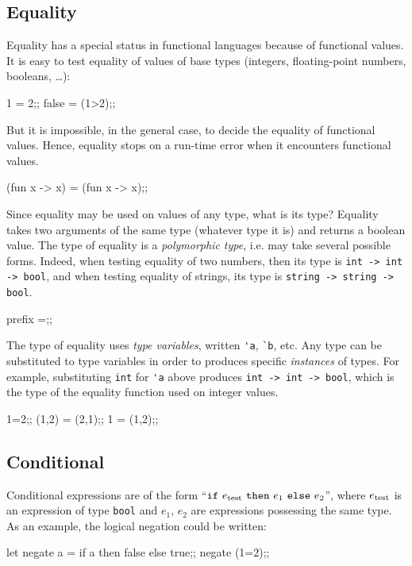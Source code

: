 \subsection{Equality}

Equality has a special status in functional languages because of
functional values. It is easy to test equality of values of base types
(integers, floating-point numbers, booleans, \ldots):
\begin{caml_example}
1 = 2;;
false = (1>2);;
\end{caml_example}
But it is impossible, in the general case, to decide the equality of
functional values. Hence, equality stops on a run-time error when
it encounters functional values.
\begin{caml_example}
(fun x -> x) = (fun x -> x);;
\end{caml_example}
Since equality may be used on values of any type, what is its type?
Equality takes two arguments of the same type (whatever type it
is) and returns a boolean value.  The type of equality is a {\em
polymorphic type}, i.e. may take several possible forms.  Indeed, when
testing equality of two numbers, then its type is
\verb|int -> int -> bool|, and when testing equality of strings, its type is
\verb|string -> string -> bool|.
\begin{caml_example}
prefix =;;
\end{caml_example}
The type of equality uses {\em type variables}, written \verb|'a|,
\verb|`b|, etc. Any type can be substituted to type variables in order
to produces specific {\em instances} of types. For example,
substituting \verb|int| for \verb|'a| above produces
\verb|int -> int -> bool|, which is the type of the equality function
used on integer values.
\begin{caml_example}
1=2;;
(1,2) = (2,1);;
1 = (1,2);;
\end{caml_example}

\subsection{Conditional}

Conditional expressions are of the form ``${\tt
if}~e_{\rm{test}}~{\tt then}~e_1~{\tt else}~e_2$'', where
$e_{\rm{test}}$ is an expression of type {\tt bool} and $e_1$, $e_2$
are expressions possessing the same type. As an example, the logical
negation could be written:
\begin{caml_example}
let negate a = if a then false else true;;
negate (1=2);;
\end{caml_example}


